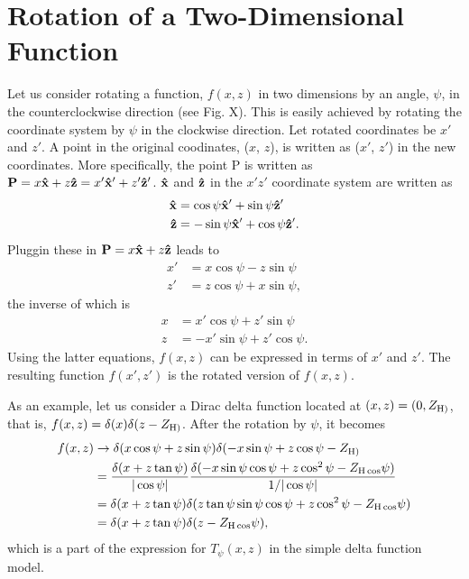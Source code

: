 \section{Rotation of a Two-Dimensional Function}
Let us consider rotating a function, $f(x,z)$ in two dimensions by an angle, 
$\psi$, in the counterclockwise direction (see Fig. X). This is easily 
achieved by rotating the coordinate system by $\psi$ in the clockwise direction. 
Let rotated coordinates be $x'$ and $z'$. A point in the original coodinates,
($x$, $z$), is written as ($x'$, $z'$) in the new coordinates. More specifically,
the point P is written as 
$\mathbf{P}=x\mathbf{\hat{x}}+z\mathbf{\hat{z}}=x'\mathbf{\hat{x}}'+z'\mathbf{\hat{z}}'$. $\mathbf{\hat{x}}$ and $\mathbf{\hat{z}}$ in
the $x'z'$ coordinate system are written as 
\begin{align}
  \mathbf{\hat{x}} &= \cos\psi\mathbf{\hat{x}}'+\sin\psi\mathbf{\hat{z}}' \\
  \mathbf{\hat{z}} &= -\sin\psi\mathbf{\hat{x}}'+\cos\psi\mathbf{\hat{z}}'.
\end{align}
Pluggin these in $\mathbf{P}=x\mathbf{\hat{x}}+z\mathbf{\hat{z}}$ leads to
\begin{align}
  x' &= x\cos\psi - z\sin\psi \\
  z' &= z\cos\psi + x\sin\psi,
\end{align}
the inverse of which is
\begin{align}
  x &= x'\cos\psi + z'\sin\psi \\
  z &= -x'\sin\psi + z'\cos\psi.
\end{align}
Using the latter equations, $f(x,z)$ can be expressed in terms of $x'$ and $z'$. 
The resulting function $f(x',z')$ is the rotated version of $f(x,z)$. 

As an 
example, let us consider a Dirac delta function located at $(x,z)=(0,Z_{\mathrm{H})}$,
that is, $f(x,z)=\delta(x)\delta(z-Z_{\mathrm{H})}$. After the rotation by $\psi$, it 
becomes
\begin{align*}
  f(x,z) 
  &\rightarrow 
    \delta(x\cos\psi+z\sin\psi) \delta(-x\sin\psi+z\cos\psi-Z_{\mathrm{H})} \\
  &= \frac{\delta(x+z\tan\psi)}{|\cos\psi|}
     \frac{\delta(-x\sin\psi\cos\psi+z\cos^2\psi-Z_{\mathrm{H}\cos}\psi)}{1/|\cos\psi|} \\
  &= \delta(x+z\tan\psi)\delta(z\tan\psi\sin\psi\cos\psi+z\cos^2\psi-Z_{\mathrm{H}\cos}\psi) \\
  &= \delta(x+z\tan\psi)\delta(z-Z_{\mathrm{H}\cos}\psi),
\end{align*}
which is a part of the expression for $T_\psi(x,z)$ in the simple delta 
function model.

